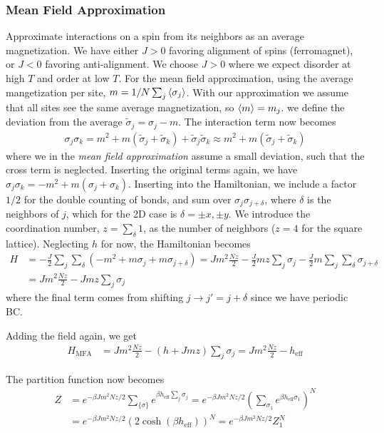 \documentclass[a4paper, english, 12pt]{article}
\newcommand{\closed}[1]{\left( #1 \right)}
\newcommand{\curly}[1]{\{ #1 \} }
\begin{document}
\begin{multicols*}{2}
\subsubsection*{Mean Field Approximation}
Approximate interactions on a spin from its neighbors as an average magnetization. We have either $J>0$ favoring alignment of spins (ferromagnet), or $J<0$ favoring anti-alignment. We choose $J>0$ where we expect disorder at high $T$ and order at low $T$. For the mean field approximation, using the average mangetization per site, $m=1/N \sum_j \expval{\sigma_j}$. With our approximation we assume that all sites see the same average magnetization, so $\expval{m}=m_j$. we define the deviation from the average $\tilde{\sigma}_j=\sigma_j-m$. The interaction term now becomes 
\begin{align*}
    \sigma_j\sigma_k = m^2 + m(\tilde{\sigma}_j + \tilde{\sigma}_k) + \tilde{\sigma}_j \tilde{\sigma}_k \approx m^2 + m(\tilde{\sigma}_j + \tilde{\sigma}_k)
\end{align*}
where we in the \textit{mean field approximation} assume a small deviation, such that the cross term is neglected. Inserting the original terms again, we have $\sigma_j\sigma_k=-m^2+m(\sigma_j+\sigma_k)$. Inserting into the Hamiltonian, we include a factor $1/2$ for the double counting of bonds, and sum over $\sigma_j \sigma_{j+\delta}$, where $\delta$ is the neighbors of $j$, which for the 2D case is $\delta=\pm x,\pm y$.  We introduce the coordination number, $z=\sum_\delta 1$, as the number of neighbors ($z=4$ for the square lattice). Neglecting $h$ for now, the Hamiltonian becomes 
\begin{align*}
    H &= -\frac{J}{2}\sum_j \sum_\delta \closed{-m^2 + m\sigma_j + m\sigma_{j+\delta}} = Jm^2 \frac{Nz}{2} - \frac{J}{2} mz \sum_j \sigma_j - \frac{J}{2}m \sum_j \sum_\delta \sigma_{j+\delta} \\ 
    &= Jm^2 \frac{Nz}{2} - J mz \sum_j \sigma_j
\end{align*}  
where the final term comes from shifting $j\to j'=j+\delta$ since we have periodic BC. 

Adding the field again, we get 
\begin{align*}
    H_{\mathrm{MFA}} &= Jm^2 \frac{Nz}{2} - (h+Jmz)\sum_j \sigma_j = Jm^2 \frac{Nz}{2} - h_{\mathrm{eff}} 
\end{align*}


The partition function now becomes 
\begin{align*}
    Z &= e^{-\beta J m^2 Nz/2} \sum_{\curly{\sigma}} e^{\beta h_{\mathrm{eff}}\sum_j \sigma_j } = e^{-\beta J m^2 Nz/2} \closed{\sum_{\sigma_1} e^{\beta h_{\mathrm{eff}} \sigma_1 } }^N \\ 
    &= e^{-\beta J m^2 Nz/2} \closed{2\cosh(\beta h_{\mathrm{eff}})}^N = e^{-\beta J m^2 Nz/2} Z_1^N
\end{align*}



\end{multicols*}
\end{document}
